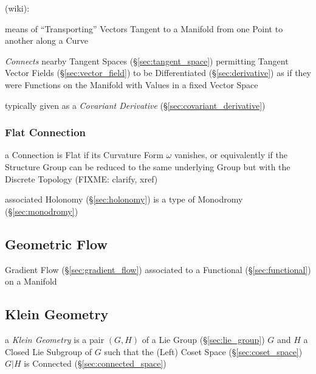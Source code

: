 (wiki):

means of ``Transporting'' Vectors Tangent to a Manifold from one Point to
another along a Curve

\emph{Connects} nearby Tangent Spaces (\S\ref{sec:tangent_space}) permitting
Tangent Vector Fields (\S\ref{sec:vector_field}) to be Differentiated
(\S\ref{sec:derivative}) as if they were Functions on the Manifold with Values
in a fixed Vector Space

typically given as a \emph{Covariant Derivative}
(\S\ref{sec:covariant_derivative})



\subsubsection{Flat Connection}\label{sec:flat_connection}

a Connection is Flat if its Curvature Form $\omega$ vanishes, or equivalently
if the Structure Group can be reduced to the same underlying Group but with the
Discrete Topology (FIXME: clarify, xref)

associated Holonomy (\S\ref{sec:holonomy}) is a type of Monodromy
(\S\ref{sec:monodromy})



\subsection{Geometric Flow}\label{sec:geometric_flow}

Gradient Flow (\S\ref{sec:gradient_flow}) associated to a Functional
(\S\ref{sec:functional}) on a Manifold



\subsection{Klein Geometry}\label{sec:klein_geometry}

a \emph{Klein Geometry} is a pair $(G,H)$ of a Lie Group
(\S\ref{sec:lie_group}) $G$ and $H$ a Closed Lie Subgroup of $G$ such
that the (Left) Coset Space (\S\ref{sec:coset_space}) $G|H$ is
Connected (\S\ref{sec:connected_space})

